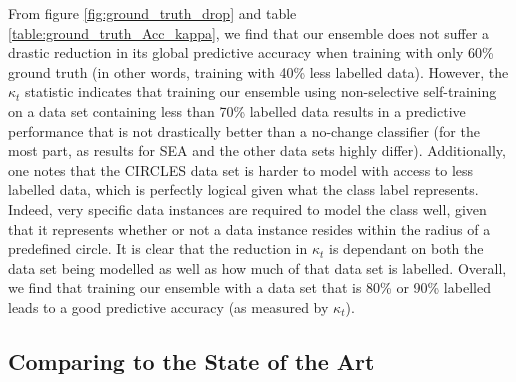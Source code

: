 \documentclass[runningheads]{llncs}
\begin{document}

From figure \ref{fig:ground_truth_drop} and table \ref{table:ground_truth_Acc_kappa}, we find that our ensemble does not suffer a drastic reduction in its global predictive accuracy when training with only 60\% ground truth (in other words, training with 40\% less labelled data). However, the $\kappa_t$ statistic indicates that training our ensemble using non-selective self-training on a data set containing less than 70\% labelled data results in a predictive performance that is not drastically better than a no-change classifier (for the most part, as results for SEA and the other data sets highly differ). Additionally, one notes that the CIRCLES data set is harder to model with access to less labelled data, which is perfectly logical given what the class label represents. Indeed, very specific data instances are required to model the class well, given that it represents whether or not a data instance resides within the radius of a predefined circle. It is clear that the reduction in $\kappa_t$ is dependant on both the data set being modelled as well as how much of that data set is labelled. Overall, we find that training our ensemble with a data set that is 80\% or 90\% labelled leads to a good predictive accuracy (as measured by $\kappa_t$).

\subsection{Comparing to the State of the Art}


\end{document}
